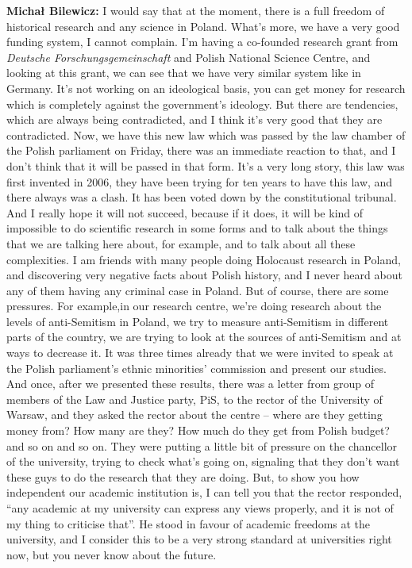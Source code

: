 \textbf{Michał Bilewicz:} I would say that at the moment, there is a full freedom of historical research and any science in Poland. What’s more, we have a very good funding system, I cannot complain. I’m having a co-founded research grant from \textit{Deutsche Forschungsgemeinschaft} and Polish National Science Centre, and looking at this grant, we can see that we have very similar system like in Germany. It's not working on an ideological basis, you can get money for research which is completely against the government’s ideology. But there are tendencies, which are always being contradicted, and I think it’s very good that they are contradicted. Now, we have this new law which was passed by the law chamber of the Polish parliament on Friday, there was an immediate reaction to that, and I don’t think that it will be passed in that form. It’s a very long story, this law was first invented in 2006, they have been trying for ten years to have this law, and there always was a clash. It has been voted down by the constitutional tribunal. And I really hope it will not succeed, because if it does, it will be kind of impossible to do scientific research in some forms and to talk about the things that we are talking here about, for example, and to talk about all these complexities.
I am friends with many people doing Holocaust research in Poland, and discovering very negative facts about Polish history, and I never heard about any of them having any criminal case in Poland. But of course, there are some pressures. For example,in our research centre, we’re doing research about the levels of anti-Semitism in Poland, we try to measure anti-Semitism in different parts of the country, we are trying to look at the sources of anti-Semitism and at ways to decrease it. It was three times already that we were invited to speak at the Polish parliament’s ethnic minorities’ commission and present our studies. And once, after we presented these results, there was a letter from group of members of the Law and Justice party, PiS, to the rector of the University of Warsaw, and they asked the rector about the centre – where are they getting money from? How many are they? How much do they get from Polish budget? and so on and so on. They were putting a little bit of pressure on the chancellor of the university, trying to check what’s going on, signaling that they don’t want these guys to do the research that they are doing. But, to show you how independent our academic institution is, I can tell you that the rector responded, ``any academic at my university can express any views properly, and it is not of my thing to criticise that''. He stood in favour of academic freedoms at the university, and I consider this to be a very strong standard at universities right now, but you never know about the future.

